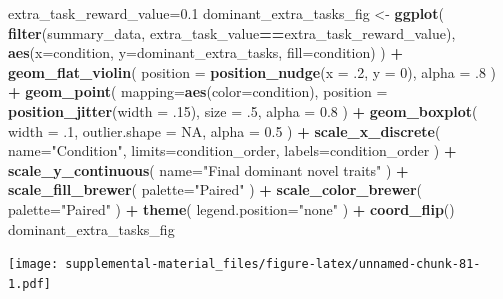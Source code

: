 \documentclass[]{book}
\newenvironment{Shaded}{\begin{snugshade}}{\end{snugshade}}
\newcommand{\DataTypeTok}[1]{\textcolor[rgb]{0.13,0.29,0.53}{#1}}
\newcommand{\DecValTok}[1]{\textcolor[rgb]{0.00,0.00,0.81}{#1}}
\newcommand{\FloatTok}[1]{\textcolor[rgb]{0.00,0.00,0.81}{#1}}
\newcommand{\KeywordTok}[1]{\textcolor[rgb]{0.13,0.29,0.53}{\textbf{#1}}}
\newcommand{\NormalTok}[1]{#1}
\newcommand{\OperatorTok}[1]{\textcolor[rgb]{0.81,0.36,0.00}{\textbf{#1}}}
\newcommand{\OtherTok}[1]{\textcolor[rgb]{0.56,0.35,0.01}{#1}}
\newcommand{\StringTok}[1]{\textcolor[rgb]{0.31,0.60,0.02}{#1}}
\begin{document}
\begin{Shaded}
\begin{Highlighting}[]
\NormalTok{extra_task_reward_value=}\FloatTok{0.1}
\NormalTok{dominant_extra_tasks_fig <-}\StringTok{ }\KeywordTok{ggplot}\NormalTok{(}
    \KeywordTok{filter}\NormalTok{(summary_data, extra_task_value}\OperatorTok{==}\NormalTok{extra_task_reward_value),}
    \KeywordTok{aes}\NormalTok{(}\DataTypeTok{x=}\NormalTok{condition, }\DataTypeTok{y=}\NormalTok{dominant_extra_tasks, }\DataTypeTok{fill=}\NormalTok{condition)}
\NormalTok{  ) }\OperatorTok{+}
\StringTok{  }\KeywordTok{geom_flat_violin}\NormalTok{(}
    \DataTypeTok{position =} \KeywordTok{position_nudge}\NormalTok{(}\DataTypeTok{x =} \FloatTok{.2}\NormalTok{, }\DataTypeTok{y =} \DecValTok{0}\NormalTok{),}
    \DataTypeTok{alpha =} \FloatTok{.8}
\NormalTok{  ) }\OperatorTok{+}
\StringTok{  }\KeywordTok{geom_point}\NormalTok{(}
    \DataTypeTok{mapping=}\KeywordTok{aes}\NormalTok{(}\DataTypeTok{color=}\NormalTok{condition),}
    \DataTypeTok{position =} \KeywordTok{position_jitter}\NormalTok{(}\DataTypeTok{width =} \FloatTok{.15}\NormalTok{),}
    \DataTypeTok{size =} \FloatTok{.5}\NormalTok{,}
    \DataTypeTok{alpha =} \FloatTok{0.8}
\NormalTok{  ) }\OperatorTok{+}
\StringTok{  }\KeywordTok{geom_boxplot}\NormalTok{(}
    \DataTypeTok{width =} \FloatTok{.1}\NormalTok{,}
    \DataTypeTok{outlier.shape =} \OtherTok{NA}\NormalTok{,}
    \DataTypeTok{alpha =} \FloatTok{0.5}
\NormalTok{  ) }\OperatorTok{+}
\StringTok{  }\KeywordTok{scale_x_discrete}\NormalTok{(}
    \DataTypeTok{name=}\StringTok{"Condition"}\NormalTok{,}
    \DataTypeTok{limits=}\NormalTok{condition_order,}
    \DataTypeTok{labels=}\NormalTok{condition_order}
\NormalTok{  ) }\OperatorTok{+}
\StringTok{  }\KeywordTok{scale_y_continuous}\NormalTok{(}
    \DataTypeTok{name=}\StringTok{"Final dominant novel traits"}
\NormalTok{  ) }\OperatorTok{+}
\StringTok{  }\KeywordTok{scale_fill_brewer}\NormalTok{(}
    \DataTypeTok{palette=}\StringTok{"Paired"}
\NormalTok{  ) }\OperatorTok{+}
\StringTok{  }\KeywordTok{scale_color_brewer}\NormalTok{(}
    \DataTypeTok{palette=}\StringTok{"Paired"}
\NormalTok{  ) }\OperatorTok{+}
\StringTok{  }\KeywordTok{theme}\NormalTok{(}
    \DataTypeTok{legend.position=}\StringTok{"none"}
\NormalTok{  ) }\OperatorTok{+}
\StringTok{  }\KeywordTok{coord_flip}\NormalTok{()}
\NormalTok{dominant_extra_tasks_fig}
\end{Highlighting}
\end{Shaded}

\texttt{[image: supplemental-material\_files/figure-latex/unnamed-chunk-81-1.pdf]}
\end{document}
